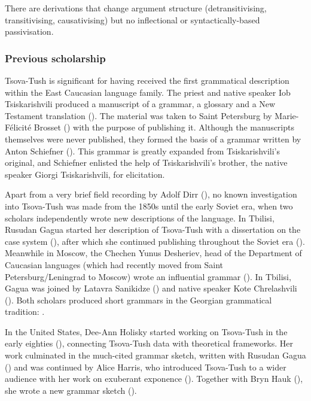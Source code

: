 There are derivations that change argument structure (detransitivising, transitivising, causativising) but no inflectional or syntactically-based passivisation.



\subsubsection{Previous scholarship}


Tsova-Tush is significant for having received the first grammatical description within the East Caucasian language family. The priest and native speaker Iob Tsiskarishvili produced a manuscript of a grammar, a glossary and a New Testament translation (\cite{tsiskarovgloss,tsiskarovgram,tsiskarovbible}). The material was taken to Saint Petersburg by Marie-Félicité Brosset (\cite{brosset}) with the purpose of publishing it. Although the manuscripts themselves were never published, they formed the basis of a grammar written by Anton Schiefner (\cite{schiefner54,schiefner56,schiefner59}). This grammar is greatly expanded from Tsiskarishvili's original, and Schiefner enlisted the help of Tsiskarishvili's brother, the native speaker Giorgi Tsiskarishvili, for elicitation. 

Apart from a very brief field recording by Adolf Dirr (\cite{dirr-tt}), no known investigation into Tsova-Tush was made from the 1850s until the early Soviet era, when two scholars independently wrote new descriptions of the language. In Tbilisi, Rusudan Gagua started her description of Tsova-Tush with a dissertation on the case system (\cite{gagua43diss}), after which she continued publishing throughout the Soviet era (\cite{gagua48erg,gagua52,gagua56vowel,gagua62,gagua83noun,gagua87,holiskygagua}). Meanwhile in Moscow, the Chechen Yunus Desheriev, head of the Department of Caucasian languages (which had recently moved from Saint Petersburg/Leningrad to Moscow) wrote an influential grammar (\cite{desheriev53}). In Tbilisi, Gagua was joined by Latavra Sanikidze (\cite{sanikidze66redupl,sanikidze76decl,sanikidze84q}) and native speaker Kote Chrelashvili (\cite{chrelashvili67,chrelashvili82,chrelashvili84,chrelashvili87,chrelashvili90}). Both scholars produced short grammars in the Georgian grammatical tradition: \textcite{chrelashvili02,chrelashvili07,sanikidze10}. 

In the United States, Dee-Ann Holisky started working on Tsova-Tush in the early eighties (\cite{holisky84,holisky85,holisky87}), connecting Tsova-Tush data with theoretical frameworks. Her work culminated in the much-cited grammar sketch, written with Rusudan Gagua (\cite{holiskygagua}) and was continued by Alice Harris, who introduced Tsova-Tush to a wider audience with her work on exuberant exponence (\cite{harris08,harris09,harris11,harris13metath,harrissamuel}). Together with Bryn Hauk (\cite{hauk}), she wrote a new grammar sketch (\cite{haukharris}). 

